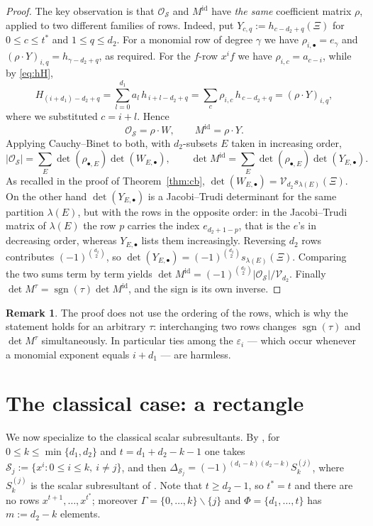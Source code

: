 \documentclass[11pt,reqno]{amsart}
\theoremstyle{plain}
\theoremstyle{definition}
\newtheorem{remark}[theorem]{Remark}
\DeclareMathOperator{\sgn}{sgn}
\newcommand{\bX}{\Xi}
\newcommand{\cO}{\mathcal{O}}
\newcommand{\cS}{\mathcal{S}}
\newcommand{\cV}{\mathcal{V}}
\begin{document}
\begin{proof}
The key observation is that $\cO_\cS$ and $M^{\mathrm{id}}$ have \emph{the same}
coefficient matrix $\rho$, applied to two different families of rows. Indeed, put
$Y_{c,q}:=h_{c-d_2+q}(\bX)$ for $0\le c\le t^*$ and $1\le q\le d_2$. For a
monomial row of degree $\gamma$ we have $\rho_{i,\bullet}=e_\gamma$ and
$(\rho\cdot Y)_{i,q}=h_{\gamma-d_2+q}$, as required. For the $f$-row $x^if$ we
have $\rho_{i,c}=a_{c-i}$, while by \eqref{eq:hH},
\[
  H_{(i+d_1)-d_2+q}=\sum_{l=0}^{d_1}a_l\,h_{\,i+l-d_2+q}
  =\sum_{c}\rho_{i,c}\,h_{\,c-d_2+q}=(\rho\cdot Y)_{i,q},
\]
where we substituted $c=i+l$. Hence
\[
  \cO_\cS=\rho\cdot W,\qquad M^{\mathrm{id}}=\rho\cdot Y .
\]
Applying Cauchy--Binet to both, with $d_2$-subsets $E$ taken in increasing order,
\[
  |\cO_\cS|=\sum_E\det(\rho_{\bullet,E})\det(W_{E,\bullet}),\qquad
  \det M^{\mathrm{id}}=\sum_E\det(\rho_{\bullet,E})\det(Y_{E,\bullet}) .
\]
As recalled in the proof of Theorem~\ref{thm:cb},
$\det(W_{E,\bullet})=\cV_{d_2}s_{\lambda(E)}(\bX)$. On the other hand
$\det(Y_{E,\bullet})$ is a Jacobi--Trudi determinant for the same partition
$\lambda(E)$, but with the rows in the opposite order: in the Jacobi--Trudi
matrix of $\lambda(E)$ the row $p$ carries the index $e_{d_2+1-p}$, that is the
$e$'s in decreasing order, whereas $Y_{E,\bullet}$ lists them increasingly.
Reversing $d_2$ rows contributes $(-1)^{\binom{d_2}{2}}$, so
$\det(Y_{E,\bullet})=(-1)^{\binom{d_2}{2}}s_{\lambda(E)}(\bX)$. Comparing the two
sums term by term yields
$\det M^{\mathrm{id}}=(-1)^{\binom{d_2}{2}}|\cO_\cS|/\cV_{d_2}$. Finally
$\det M^\tau=\sgn(\tau)\det M^{\mathrm{id}}$, and the sign is its own inverse.
\end{proof}

\begin{remark}
The proof does not use the ordering of the rows, which is why the statement holds
for an arbitrary $\tau$: interchanging two rows changes $\sgn(\tau)$ and
$\det M^\tau$ simultaneously. In particular ties among the $\varepsilon_i$ --- which
occur whenever a monomial exponent equals $i+d_1$ --- are harmless.
\end{remark}

\section{The classical case: a rectangle}\label{sec:rect}

We now specialize to the classical scalar subresultants. By
\cite[Rmk.~2.1(2)]{DKS05}, for $0\le k\le\min\{d_1,d_2\}$ and
$t=d_1+d_2-k-1$ one takes $\cS_j:=\{x^i:0\le i\le k,\ i\ne j\}$, and then
$\Delta_{\cS_j}=(-1)^{(d_1-k)(d_2-k)}S_k^{(j)}$, where $S_k^{(j)}$ is the scalar
subresultant of \cite[(3)]{DKS05}. Note that $t\ge d_2-1$, so $t^*=t$ and there
are no rows $x^{t+1},\dots,x^{t^*}$; moreover $\Gamma=\{0,\dots,k\}\smallsetminus\{j\}$
and $\Phi=\{d_1,\dots,t\}$ has $m:=d_2-k$ elements.
\end{document}
